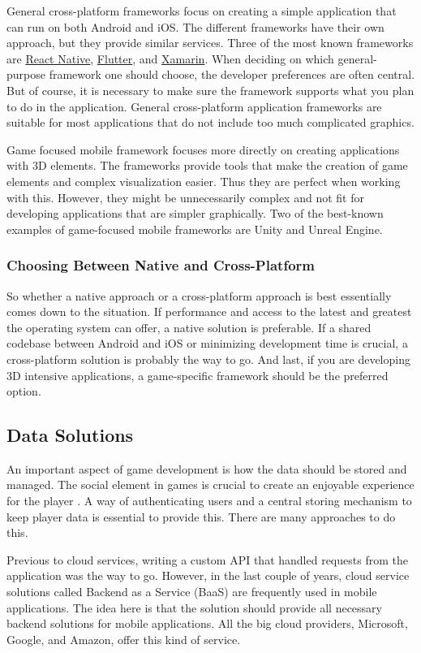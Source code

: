 General cross-platform frameworks focus on creating a simple application that can run on both Android and iOS. The different frameworks have their own approach, but they provide similar services. Three of the most known frameworks are \href{https://reactnative.dev}{React Native}, \href{https://flutter.dev}{Flutter}, and \href{https://dotnet.microsoft.com/apps/xamarin}{Xamarin}. When deciding on which general-purpose framework one should choose, the developer preferences are often central. But of course, it is necessary to make sure the framework supports what you plan to do in the application. General cross-platform application frameworks are suitable for most applications that do not include too much complicated graphics.

Game focused mobile framework focuses more directly on creating applications with 3D elements. The frameworks provide tools that make the creation of game elements and complex visualization easier. Thus they are perfect when working with this. However, they might be unnecessarily complex and not fit for developing applications that are simpler graphically. Two of the best-known examples of game-focused mobile frameworks are Unity and Unreal Engine.

\subsubsection{Choosing Between Native and Cross-Platform}
So whether a native approach or a cross-platform approach is best essentially comes down to the situation. If performance and access to the latest and greatest the operating system can offer, a native solution is preferable. If a shared codebase between Android and iOS or minimizing development time is crucial, a cross-platform solution is probably the way to go. And last, if you are developing 3D intensive applications, a game-specific framework should be the preferred option.

\subsection{Data Solutions}
An important aspect of game development is how the data should be stored and managed. The social element in games is crucial to create an enjoyable experience for the player \citep{sweetser_gameflow_2005}. A way of authenticating users and a central storing mechanism to keep player data is essential to provide this. There are many approaches to do this. 

Previous to cloud services, writing a custom API that handled requests from the application was the way to go. However, in the last couple of years, cloud service solutions called Backend as a Service (BaaS) are frequently used in mobile applications. The idea here is that the solution should provide all necessary backend solutions for mobile applications. All the big cloud providers, Microsoft, Google, and Amazon, offer this kind of service.

